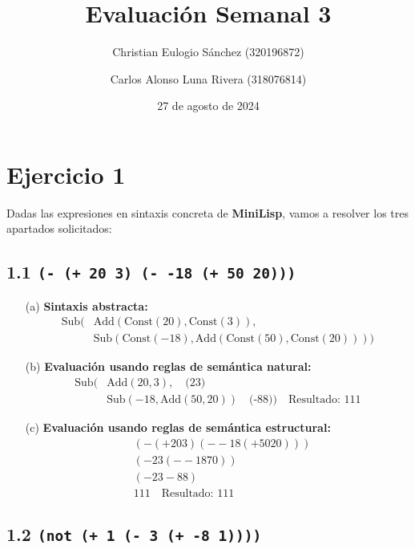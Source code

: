 \documentclass{article}
\title{Evaluación Semanal 3}
\author{Christian Eulogio Sánchez (320196872) \and Carlos Alonso Luna Rivera (318076814)}
\date{27 de agosto de 2024}
\begin{document}
\maketitle

\section*{Ejercicio 1}

Dadas las expresiones en sintaxis concreta de \textbf{MiniLisp}, vamos a resolver los tres apartados solicitados:

\subsection*{1.1 \texttt{(- (+ 20 3) (- -18 (+ 50 20)))}}

\begin{itemize}
    \item[(a)] \textbf{Sintaxis abstracta:}
    \begin{align*}
    \text{Sub}(
        &\text{Add}(\text{Const}(20), \text{Const}(3)), \\
        &\text{Sub}(\text{Const}(-18), \text{Add}(\text{Const}(50), \text{Const}(20)))
    )
    \end{align*}

    \item[(b)] \textbf{Evaluación usando reglas de semántica natural:}
    \begin{align*}
    \text{Sub}(
        &\text{Add}(20, 3),  \quad \text{(23)} \\
        &\text{Sub}(-18, \text{Add}(50, 20))  \quad \text{(-88)}
    )  \quad \text{Resultado: } 111
    \end{align*}
    
    \item[(c)] \textbf{Evaluación usando reglas de semántica estructural:}
    \begin{align*}
    &(- (+ 20 3) (- -18 (+ 50 20))) \\
    &(- 23 (- -18 70)) \\
    &(- 23 -88) \\
    &111 \quad \text{Resultado: } 111
    \end{align*}
\end{itemize}

\subsection*{1.2 \texttt{(not (+ 1 (- 3 (+ -8 1))))}}
\end{document}
